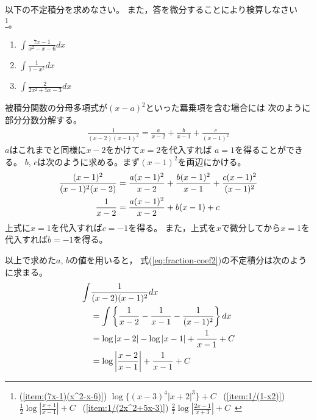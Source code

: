\documentclass[twocolumn,11pt]{jarticle}
\begin{document}
\exercise
以下の不定積分を求めなさい。
また，答を微分することにより検算しなさい
\footnote{
(\ref{item:(7x-1)(x^2-x-6)}) $\log\{(x-3)^4|x+2|^3\}+C$~
(\ref{item:1/(1-x2)}) $\frac{1}{2}\log|\frac{x+1}{x-1}|+C$~
(\ref{item:1/(2x^2+5x-3)}) $\frac{2}{7}\log|\frac{2x-1}{x+3}|+C$~
}。
\begin{enumerate}
\item \label{item:(7x-1)(x^2-x-6)}$\displaystyle\int \frac{7x-1}{x^2-x-6}dx$
\item \label{item:1/(1-x2)}$\displaystyle\int \frac{1}{1-x^2}dx$
\item \label{item:1/(2x^2+5x-3)} $\displaystyle\int\frac{2}{2x^2+5x-3}dx$
\end{enumerate}

\comment
被積分関数の分母多項式が$(x-a)^2$といった羃乗項を含む場合には
次のように部分分数分解する。
\begin{align}
  \label{eq:fraction-coef2}
  \frac{1}{(x-2)(x-1)^2}
  =\frac{a}{x-2}+\frac{b}{x-1}+\frac{c}{(x-1)^2}
\end{align}
$a$はこれまでと同様に$x-2$をかけて$x=2$を代入すれば
$a=1$を得ることができる。
$b$, $c$は次のように求める。まず$(x-1)^2$を両辺にかける。
\begin{align}
  \frac{(x-1)^2}{(x-1)^2(x-2)}
  &=\frac{a(x-1)^2}{x-2}+\frac{b(x-1)^2}{x-1}+\frac{c(x-1)^2}{(x-1)^2}\notag\\
  \frac{1}{x-2}
  &=\frac{a(x-1)^2}{x-2}+b(x-1)+c\notag
\end{align}
上式に$x=1$を代入すれば$c=-1$を得る。
また，上式を$x$で微分してから$x=1$を代入すれば$b=-1$を得る。

以上で求めた$a$, $b$の値を用いると，
式(\ref{eq:fraction-coef2})の不定積分は次のように求まる。
\begin{align}
  \int&\frac{1}{(x-2)(x-1)^2}dx\notag\\
  &=\int\left\{\frac{1}{x-2}-\frac{1}{x-1}-\frac{1}{(x-1)^2}\right\}dx\notag\\
  &=\log|x-2|-\log|x-1|+\frac{1}{x-1}+C\notag\\
  &=\log \left|\frac{x-2}{x-1}\right|+\frac{1}{x-1}+C\notag
\end{align}
\end{document}
